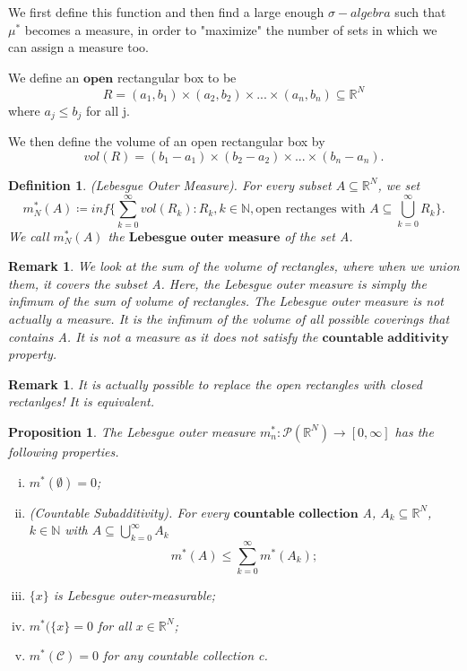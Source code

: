 \documentclass[twoside]{article}
\newtheorem{proposition}[theorem]{Proposition}
\newtheorem{remark}[theorem]{Remark}
\newtheorem{definition}[theorem]{Definition}
\newcommand{\sa}{\sigma-algebra}
\begin{document}
We first define this function and then find a large enough $\sa$ such that $\mu^*$ becomes a measure, in order to "maximize" the number of sets in which we can assign a measure too.

We define an $\textbf{open}$ rectangular box to be
$$
R = (a_1,b_1) \times (a_2,b_2) \times ... \times (a_n, b_n) \subseteq \mathbb{R}^N
$$
where $a_j \leq b_j$ for all j.

We then define the volume of an open rectangular box by
$$
vol(R) = (b_1-a_1) \times (b_2-a_2) \times ... \times (b_n - a_n).
$$

\begin{definition}
(Lebesgue Outer Measure). For every subset $A \subseteq \mathbb{R}^N$, we set
$$
m_N^*(A) \coloneqq inf\{\sum_{k=0}^{\infty}vol(R_k): R_k, k \in \mathbb{N}, \text{open rectanges with } A \subseteq \bigcup_{k=0}^{\infty}R_k\}.
$$
We call $m_N^*(A)$ the $\textbf{Lebesgue outer measure}$ of the set A. 
\end{definition}

\begin{remark}
We look at the sum of the volume of rectangles, where when we union them, it covers the subset A. Here, the Lebesgue outer measure is simply the infimum of the sum of volume of rectangles. The Lebesgue outer measure is not actually a measure. It is the infimum of the volume of all possible coverings that contains A. It is not a measure as it does not satisfy the $\textbf{countable additivity}$ property.
\end{remark}

\begin{remark} It is actually possible to replace the open rectangles with closed rectanlges! It is equivalent.
\end{remark}


\begin{proposition}
The Lebesgue outer measure $m_{n}^*: \mathcal{P}(\mathbb{R}^N) \rightarrow [0, \infty]$ has the following properties.
\begin{enumerate}[(i)]
  \item $m^*(\emptyset) = 0$;
  \item (Countable Subadditivity). For every $\textbf{countable collection}$ A, $A_k \subseteq \mathbb{R}^N$, $k \in \mathbb{N}$ with $A \subseteq \bigcup_{k=0}^{\infty}A_k$
  $$
  m^*(A) \leq \sum_{k=0}^{\infty}m^*(A_k);
  $$
  \item $\{x\}$ is Lebesgue outer-measurable;
  \item $m^*(\{x\} = 0$ for all $x \in \mathbb{R}^N$;
  \item $m^*(\mathcal{C}) = 0$ for any countable collection c.
\end{enumerate}
\end{proposition}
\end{document}
